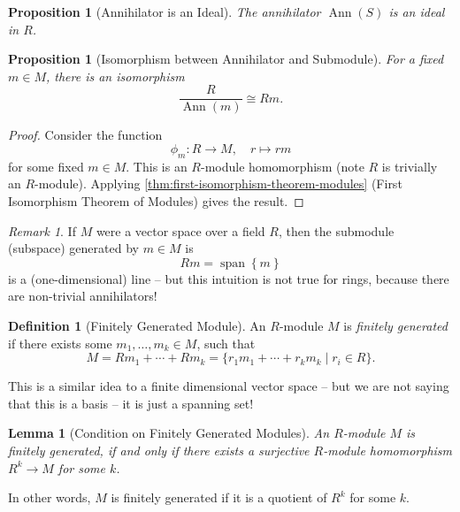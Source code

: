 \documentclass{article}
\newtheorem{lemma}[theorem]{Lemma}
\newtheorem{proposition}[theorem]{Proposition}
\theoremstyle{definition}
\newtheorem{definition}[theorem]{Definition}
\theoremstyle{remark}
\newtheorem{remark}[theorem]{Remark}
\newcommand{\pqty}[1]{\left(#1\right)}
\newcommand{\Bqty}[1]{\left\{#1\right\}}
\newcommand{\set}[2]{\{#1\mid #2\}}
\newcommand{\flatfrac}[2]{\frac{#1}{#2}}
\newcommand{\function}[5]{#1:#2\to #3,\quad #4\mapsto #5}
\newcommand{\isomorphic}{\cong}
\newcommand{\Ann}{\operatorname{Ann}}
\newcommand{\spn}{\operatorname{span}}
\begin{document}
\begin{proposition}[Annihilator is an Ideal]
    \label{prop:annihilator-ideal}%
    The annihilator \(\Ann\pqty{S}\) is an ideal in \(R\).
\end{proposition}

\begin{proposition}[Isomorphism between Annihilator and Submodule]
    \label{prop:isomorphism-annihilator-submodule}%
    For a fixed \(m \in M\), there is an isomorphism
    \[
        \flatfrac{R}{\Ann\pqty{m}} \isomorphic Rm.
    \]
\end{proposition}

\begin{proof}
    Consider the function
    \[
        \function{\phi_m}{R}{M}{r}{rm}
    \]
    for some fixed \(m \in M\). This is an \(R\)-module homomorphism (note \(R\) is trivially an \(R\)-module). Applying \autoref{thm:first-isomorphism-theorem-modules} (First Isomorphism Theorem of Modules) gives the result.
\end{proof}

\begin{remark}
    If \(M\) were a vector space over a field \(R\), then the submodule (subspace) generated by \(m \in M\) is
    \[
        Rm = \spn\Bqty{m}
    \]
    is a (one-dimensional) line -- but this intuition is not true for rings, because there are non-trivial annihilators!
\end{remark}

\begin{definition}[Finitely Generated Module]
    \label{def:finitely-generated-module}%
    An \(R\)-module \(M\) is \emph{finitely generated} if there exists some \(m_1, \ldots, m_k \in M\), such that
    \[
        M = R m_1 + \cdots + R m_k = \set{r_1 m_1 + \cdots + r_k m_k}{r_i \in R}.
    \]
\end{definition}

This is a similar idea to a finite dimensional vector space -- but we are not saying that this is a basis -- it is just a spanning set!

\begin{lemma}[Condition on Finitely Generated Modules]
    \label{lem:finitely-generated-modules-surjective-homomorphism}%
    An \(R\)-module \(M\) is finitely generated, if and only if there exists a surjective \(R\)-module homomorphism \(R^k \to M\) for some \(k\).
\end{lemma}

In other words, \(M\) is finitely generated if it is a quotient of \(R^k\) for some \(k\).
\end{document}
